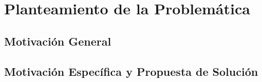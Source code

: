 
\chapter{Planteamiento de la Problemática}  %

\ifpdf
    \graphicspath{{Chapter1/Figs/Raster/}{Chapter1/Figs/PDF/}{Chapter1/Figs/}}
\else
    \graphicspath{{Chapter1/Figs/Vector/}{Chapter1/Figs/}}
\fi


\section{Motivación General}



\section{Motivación Específica y Propuesta de Solución}
